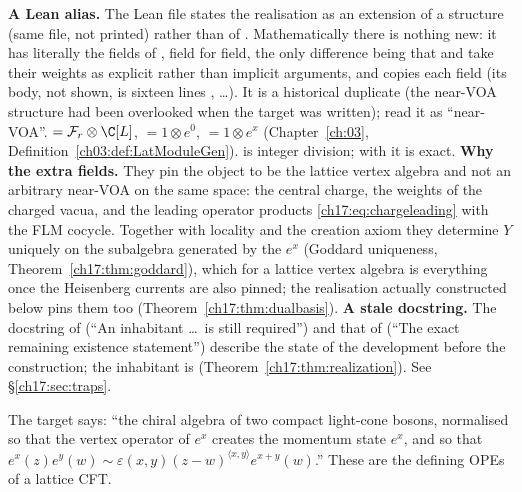 \begin{dictionary}
\textbf{A Lean alias.} The Lean file states the realisation as an extension of a structure
 (same file, not printed) rather than of .
Mathematically there is nothing new: it has literally the fields of , field for field, the only
difference being that  and  take their weights as explicit rather than
implicit arguments, and  copies each field (its body, not shown, is sixteen lines
, …).  It is a historical duplicate (the near-VOA structure had been overlooked
when the target was written); read it as ``near-VOA''.   $=\chseventeenF_r\otimes\C[L]$,
 $=1\otimes e^0$,  $=1\otimes e^x$ (Chapter~\ref{ch:03},
Definition~\ref{ch03:def:LatModuleGen}).   is integer division; with  it is exact.
\textbf{Why the extra fields.} They pin the object to be the lattice vertex algebra and not an arbitrary
near-VOA on the same space: the central charge, the weights of the charged vacua, and the leading
operator products \eqref{ch17:eq:chargeleading} with the FLM cocycle.  Together with locality and the
creation axiom they determine $Y$ uniquely on the subalgebra generated by the $e^x$ (Goddard uniqueness,
Theorem~\ref{ch17:thm:goddard}), which for a lattice vertex algebra is everything once the Heisenberg
currents are also pinned; the realisation actually constructed below pins them too
(Theorem~\ref{ch17:thm:dualbasis}).
\textbf{A stale docstring.} The docstring of  (``An inhabitant \dots\ is still
required'') and that of  (``The exact remaining existence statement'') describe
the state of the development before the construction; the inhabitant is
 (Theorem~\ref{ch17:thm:realization}).  See \S\ref{ch17:sec:traps}.
\end{dictionary}

\begin{physics}
The target says: ``the chiral algebra of two compact light-cone bosons, normalised so that the vertex
operator of $e^x$ creates the momentum state $e^x$, and so that $e^x(z)e^y(w)\sim\varepsilon(x,y)(z-w)^{\langle x,y\rangle}e^{x+y}(w)$.''
These are the defining OPEs of a lattice CFT.
\end{physics}

